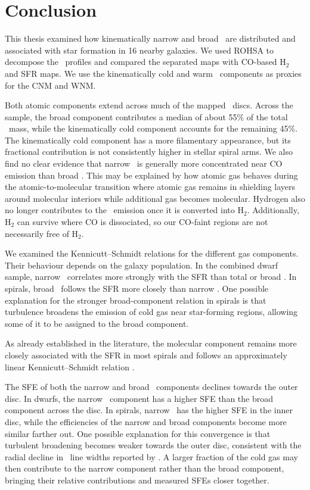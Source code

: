 \chapter[Conclusion]{Conclusion}
\label{Chap:Conclusion}

This thesis examined how kinematically narrow and broad \HI\ are distributed and associated with star formation in 16 nearby galaxies. We used ROHSA to decompose the \HI\ profiles and compared the separated maps with CO-based H$_2$ and SFR maps. We use the kinematically cold and warm \HI\ components as proxies for the CNM and WNM.

Both atomic components extend across much of the mapped \HI\ discs. Across the sample, the broad component contributes a median of about 55\% of the total \HI\ mass, while the kinematically cold component accounts for the remaining 45\%. The kinematically cold component has a more filamentary appearance, but its fractional contribution is not consistently higher in stellar spiral arms. We also find no clear evidence that narrow \HI\ is generally more concentrated near CO emission than broad \HI. This may be explained by how atomic gas behaves during the atomic-to-molecular transition where atomic gas remains in shielding layers around molecular interiors while additional gas becomes molecular. Hydrogen also no longer contributes to the \HI\ emission once it is converted into H$_2$. Additionally, H$_2$ can survive where CO is dissociated, so our CO-faint regions are not necessarily free of H$_2$.

We examined the Kennicutt--Schmidt relations for the different gas components. Their behaviour depends on the galaxy population. In the combined dwarf sample, narrow \HI\ correlates more strongly with the SFR than total or broad \HI. In spirals, broad \HI\ follows the SFR more closely than narrow \HI. One possible explanation for the stronger broad-component relation in spirals is that turbulence broadens the emission of cold gas near star-forming regions, allowing some of it to be assigned to the broad component.

As already established in the literature, the molecular component remains more closely associated with the SFR in most spirals and follows an approximately linear Kennicutt--Schmidt relation \citep{Fbigiel2008}.

The SFE of both the narrow and broad \HI\ components declines towards the outer disc. In dwarfs, the narrow \HI\ component has a higher SFE than the broad component across the disc. In spirals, narrow \HI\ has the higher SFE in the inner disc, while the efficiencies of the narrow and broad components become more similar farther out. One possible explanation for this convergence is that turbulent broadening becomes weaker towards the outer disc, consistent with the radial decline in \HI\ line widths reported by \citet{Tamburro2009}. A larger fraction of the cold gas may then contribute to the narrow component rather than the broad component, bringing their relative contributions and measured SFEs closer together.

